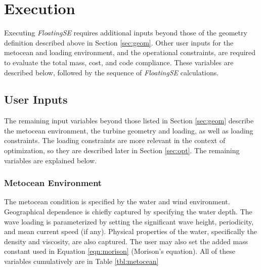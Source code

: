 \chapter{Execution}
\label{sec:exec}
Executing \textit{FloatingSE} requires additional inputs beyond those of
the geometry definition described above in Section \ref{sec:geom}.
Other user inputs for the metocean and loading environment, and the
operational constraints, are required to evaluate the total mass, cost,
and code compliance.  These variables are described below, followed by
the sequence of \textit{FloatingSE} calculations.

\section{User Inputs}
The remaining input variables beyond those listed in Section
\ref{sec:geom} describe the metocean environment, the turbine geometry
and loading, as well as loading constraints.  The loading constraints
are more relevant in the context of optimization, so they are described
later in Section \ref{sec:opt}.  The remaining variables are explained
below.

\subsection{Metocean Environment}
The metocean condition is specified by the water and wind environment.
Geographical dependence is chiefly captured by specifying the water
depth.  The wave loading is parameterized by setting the significant
wave height, periodicity, and mean current speed (if any).  Physical
properties of the water, specifically the density and viscosity, are
also captured.  The user may also set the added mass constant used in
Equation \ref{eqn:morison} (Morison's equation).  All of these variables
cumulatively are in Table \ref{tbl:metocean}

